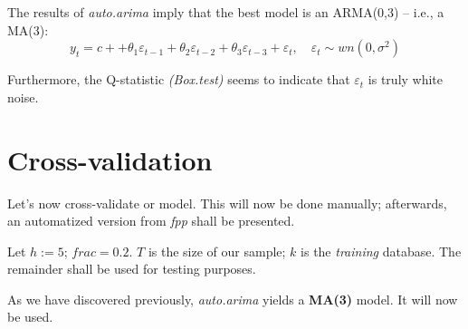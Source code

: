 \documentclass[]{article}
\newenvironment{Shaded}{\begin{snugshade}}{\end{snugshade}}
\newcommand{\CommentTok}[1]{\textcolor[rgb]{0.56,0.35,0.01}{\textit{#1}}}
\newcommand{\DataTypeTok}[1]{\textcolor[rgb]{0.13,0.29,0.53}{#1}}
\newcommand{\DecValTok}[1]{\textcolor[rgb]{0.00,0.00,0.81}{#1}}
\newcommand{\FloatTok}[1]{\textcolor[rgb]{0.00,0.00,0.81}{#1}}
\newcommand{\KeywordTok}[1]{\textcolor[rgb]{0.13,0.29,0.53}{\textbf{#1}}}
\newcommand{\NormalTok}[1]{#1}
\newcommand{\OperatorTok}[1]{\textcolor[rgb]{0.81,0.36,0.00}{\textbf{#1}}}
\newcommand{\StringTok}[1]{\textcolor[rgb]{0.31,0.60,0.02}{#1}}
\begin{document}
The results of \emph{auto.arima} imply that the best model is an
ARMA(0,3) -- i.e., a MA(3):
\[ y_t = c +  + \theta_1 \varepsilon_{t-1} + \theta_2 \varepsilon_{t-2}+ \theta_3 \varepsilon_{t-3} + \varepsilon_t, \hspace{1em} \varepsilon_t \sim wn(0, \sigma^2)\]

Furthermore, the Q-statistic \emph{(Box.test)} seems to indicate that
\(\varepsilon_t\) is truly white noise.

\section{Cross-validation}

Let's now cross-validate or model. This will now be done manually;
afterwards, an automatized version from \emph{fpp} shall be presented.

Let \(h := 5\); \(frac = 0.2\). \(T\) is the size of our sample; \(k\)
is the \emph{training} database. The remainder shall be used for testing
purposes.

As we have discovered previously, \emph{auto.arima} yields a
\textbf{MA(3)} model. It will now be used.

\begin{Shaded}
\end{Shaded}
\end{document}
